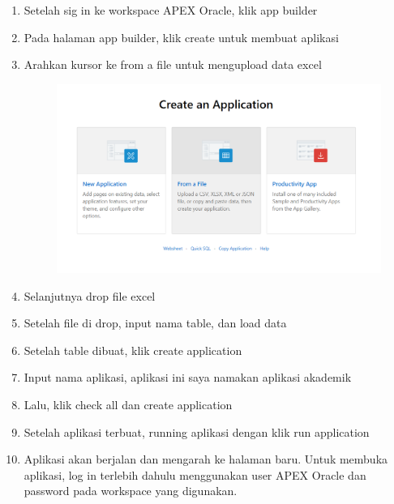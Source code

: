 \begin{enumerate}
    \item Setelah sig in ke workspace APEX Oracle, klik app builder
    \item Pada halaman app builder, klik create untuk membuat aplikasi
    \item Arahkan kursor ke from a file untuk mengupload data excel
    
\begin{figure}[!htbp]
    \centering
    \includegraphics[scale=0.5]{gambar/from.png}
    \label{penanda}
\end{figure}   
    
    \item Selanjutnya drop file excel
    \item Setelah file di drop, input nama table, dan load data
    \item Setelah table dibuat, klik create application
    \item Input nama aplikasi, aplikasi ini saya namakan aplikasi akademik

    \item Lalu, klik check all dan create application
    \item Setelah aplikasi terbuat, running aplikasi dengan klik run application
    \item Aplikasi akan berjalan dan mengarah ke halaman baru. Untuk membuka aplikasi, log in terlebih dahulu menggunakan user APEX Oracle dan password pada workspace yang digunakan.
    

\end{enumerate}

